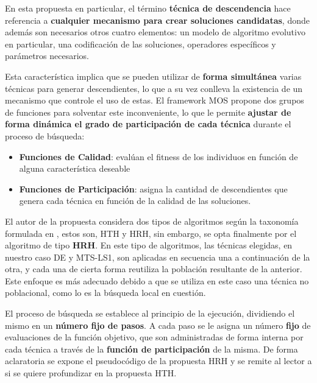 En esta propuesta en particular, el término \textbf{técnica de descendencia} hace referencia a \textbf{cualquier mecanismo para crear soluciones candidatas}, donde además son necesarios otros cuatro elementos: un modelo de algoritmo evolutivo en particular, una codificación de las soluciones, operadores específicos y parámetros necesarios. 

Esta característica implica que se pueden utilizar de \textbf{forma simultánea} varias técnicas para generar descendientes, lo que a su vez conlleva la existencia de un mecanismo que controle el uso de estas. El framework MOS propone dos grupos de funciones para solventar este inconveniente, lo que le permite \textbf{ajustar de forma dinámica el grado de participación de cada técnica} durante el proceso de búsqueda:

\begin{itemize}
	\item \textbf{Funciones de Calidad}: evalúan el fitness de los individuos en función de alguna característica deseable
	\item \textbf{Funciones de Participación}: asigna la cantidad de descendientes que genera cada técnica en función de la calidad de las soluciones.
\end{itemize}

El autor de la propuesta considera dos tipos de algoritmos según la taxonomía formulada en \cite{TaxonomyEAs}, estos son, HTH y HRH, sin embargo, se opta finalmente por el algoritmo de tipo \textbf{HRH}. En este tipo de algoritmos, las técnicas elegidas, en nuestro caso DE y MTS-LS1, son aplicadas en secuencia una a continuación de la otra, y cada una de cierta forma reutiliza la población resultante de la anterior. Este enfoque es más adecuado debido a que se utiliza en este caso una técnica no poblacional, como lo es la búsqueda local en cuestión.

El proceso de búsqueda se establece al principio de la ejecución, dividiendo el mismo en un \textbf{número fijo de pasos}. A cada paso se le asigna un número \textbf{fijo} de evaluaciones de la función objetivo, que son administradas de forma interna por cada técnica a través de la \textbf{función de participación} de la misma. De forma aclaratoria se expone el pseudocódigo de la propuesta HRH y se remite al lector a \cite{MOS2010} si se quiere profundizar en la propuesta HTH.

